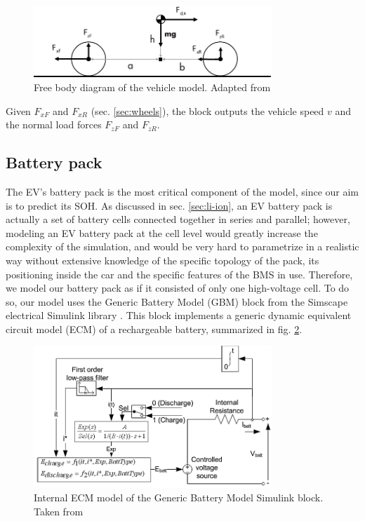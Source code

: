 \begin{figure}[hbt!]
\centering
\includegraphics[width=0.8\textwidth]{images/free_body_diagram}
\caption[Free body diagram of a vehicle]{Free body diagram of the vehicle model. Adapted from \cite{mathworks:body}}
\label{fig:free_body_diagram}
\end{figure}

Given $F_{xF}$ and $F_{xR}$ (sec. \ref{sec:wheels}), the block outputs the vehicle speed $v$ and the normal load forces $F_{zF}$ and $F_{zR}$.



\subsection{Battery pack}
\label{sec:battery_pack}
The EV's battery pack is the most critical component of the model, since our aim is to predict its SOH. As discussed in sec. \ref{sec:li-ion}, an EV battery pack is actually a set of battery cells connected together in series and parallel; however, modeling an EV battery pack at the cell level would greatly increase the complexity of the simulation, and would be very hard to parametrize in a realistic way without extensive knowledge of the specific topology of the pack, its positioning inside the car and the specific features of the BMS in use. Therefore, we model our battery pack as if it consisted of only one high-voltage cell. To do so, our model uses the Generic Battery Model (GBM) block from the Simscape electrical Simulink library \cite{mathworks:battery}.
This block implements a generic dynamic equivalent circuit model (ECM) of a rechargeable battery, summarized in fig. \ref{fig:battery_ECM}.

\begin{figure}[htb]
    \centering
    \includegraphics[width=0.8\textwidth]{images/battery_ECM.png}
    \caption[GBM internal ECM model]{Internal ECM model of the Generic Battery Model Simulink block. Taken from \cite{mathworks:battery}}
    \label{fig:battery_ECM}
\end{figure}

